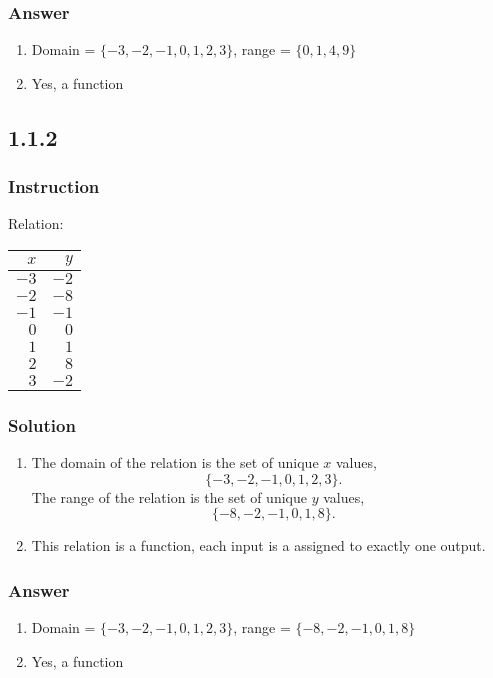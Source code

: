 \documentclass[12pt, letterpaper, oneside]{memoir}
\begin{document}
\subsubsection{Answer}

\begin{enumerate}[label=(\alph*)]
  \item Domain = $ \{ -3, -2, -1, 0, 1, 2, 3 \} $, range = $ \{ 0, 1, 4, 9 \} $
  \item Yes, a function
\end{enumerate}

\subsection*{1.1.2}

\subsubsection{Instruction}

Relation:

\begin{table}[h]
  \begin{tabular}{ r r }
    \hline
    $ x $ & $ y $ \\
    \hline
    $ -3 $ & $ -2 $ \\
    $ -2 $ & $ -8 $ \\
    $ -1 $ & $ -1 $ \\
    $ 0 $ & $ 0 $ \\
    $ 1 $ & $ 1 $ \\
    $ 2 $ & $ 8 $ \\
    $ 3 $ & $ -2 $ \\
    \hline
  \end{tabular}
\end{table}

\subsubsection{Solution}

\begin{enumerate}[label=(\alph*)]
  \item The domain of the relation is the set of unique $ x $ values,
    $$ \phantom{.}
    \{ -3, -2, -1, 0, 1, 2, 3 \}
    .$$
    The range of the relation is the set of unique $ y $ values,
    $$ \phantom{.}
    \{ -8, -2, -1, 0, 1, 8\}
    .$$
  \item This relation is a function, each input is a assigned to exactly one output.
\end{enumerate}

\subsubsection{Answer}

\begin{enumerate}[label=(\alph*)]
  \item Domain = $ \{ -3, -2, -1, 0, 1, 2, 3 \} $, range = $ \{ -8, -2, -1, 0, 1, 8\} $
  \item Yes, a function
\end{enumerate}
\end{document}

